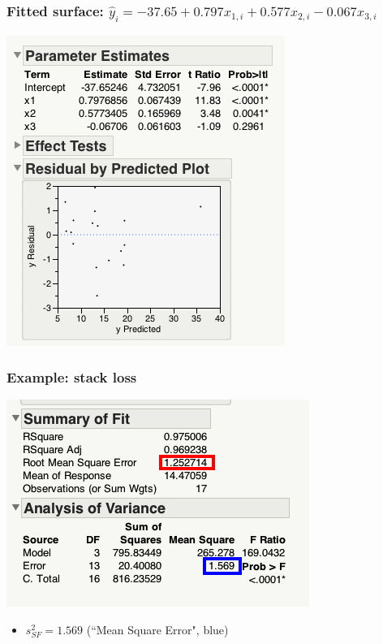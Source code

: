 \documentclass[handout]{beamer}\usepackage{graphicx, color}
\providecommand{\wh}[1]{\widehat{#1}}
\numberwithin{equation}{section}
\begin{document}
\begin{frame}
\frametitle{Fitted surface: $\wh{y}_i = -37.65 + 0.797 x_{1, i} + 0.577 x_{2, i} - 0.067 x_{3, i}$}
\begin{center}
 \includegraphics{../../fig/stackoutput.png}
\end{center}
\end{frame}


\begin{frame}
\frametitle{Example: stack loss}
\begin{center}
 \includegraphics{../../fig/stackmse.png}
\begin{itemize}
\item $s_{SF}^2 = 1.569$ (``Mean Square Error", blue)
\end{itemize}
\end{center}
\end{frame}
\end{document}
